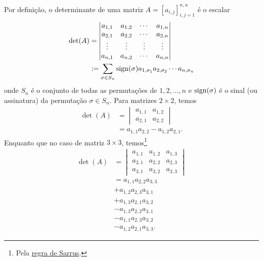 Por definição, o determinante de uma matriz $A = [a_{i,j}]_{i,j=1}^{n,n}$ é o escalar
\begin{subequations}
  \begin{align}
    \det(A) &=
              \begin{vmatrix}
                a_{1,1} & a_{1,2} & \cdots & a_{1,n}\\
                a_{2,1} & a_{2,2} & \cdots & a_{2,n}\\
                \vdots & \vdots & \vdots & \vdots\\
                a_{n,1} & a_{n,2} & \cdots & a_{n,n}                
              \end{vmatrix}\\
            &:= \sum_{\sigma\in S_n}\operatorname{sign}(\sigma)a_{1,\sigma_1}a_{2,\sigma_2}\cdots a_{n,\sigma_n}
  \end{align}
\end{subequations}
onde $S_n$ é o conjunto de todas as permutações de ${1, 2, \dotsc, n}$ e $\operatorname{sign}(\sigma)$ é o sinal (ou assinatura) da permutação $\sigma\in S_n$. Para matrizes $2\times 2$, temos
\begin{subequations}
  \begin{align}
    \det(A) &=
        \begin{vmatrix}
          a_{1,1} & a_{1,2}\\
          a_{2,1} & a_{2,2}
        \end{vmatrix}\\
      &= a_{1,1}a_{2,2} - a_{1,2}a_{2,1}.
  \end{align}
\end{subequations}
Enquanto que no caso de matriz $3\times 3$, temos\footnote{Pela \href{https://pt.wikipedia.org/wiki/Regra_de_Sarrus}{regra de Sarrus}.}
\begin{subequations}
  \begin{align}
    \det(A) &=
              \begin{vmatrix}
                a_{1,1} & a_{1,2} & a_{1,3}\\
                a_{2,1} & a_{2,2} & a_{2,3}\\
                a_{3,1} & a_{3,2} & a_{3,3}
              \end{vmatrix}\\
            &= a_{1,1}a_{2,2}a_{3,3}\\
            &+ a_{1,2}a_{2,3}a_{3,1}\\
            &+ a_{1,3}a_{2,1}a_{3,2}\\
            &- a_{1,3}a_{2,2}a_{3,1}\\
            &- a_{1,1}a_{2,3}a_{3,2}\\
            &- a_{1,2}a_{2,1}a_{3,3}.
  \end{align}
\end{subequations}

